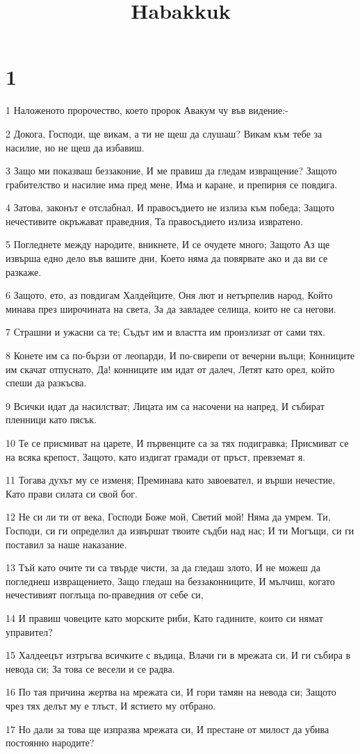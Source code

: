 

\title{Habakkuk}


\chapter{1}

\par 1 Наложеното пророчество, което пророк Авакум чу във видение:-
\par 2 Докога, Господи, ще викам, а ти не щеш да слушаш? Викам към тебе за насилие, но не щеш да избавиш.
\par 3 Защо ми показваш беззаконие, И ме правиш да гледам извращение? Защото грабителство и насилие има пред мене, Има и каране, и препирня се повдига.
\par 4 Затова, законът е отслабнал, И правосъдието не излиза към победа; Защото нечестивите окръжават праведния, Та правосъдието излиза извратено.
\par 5 Погледнете между народите, вникнете, И се очудете много; Защото Аз ще извърша едно дело във вашите дни, Което няма да повярвате ако и  да ви се разкаже.
\par 6 Защото, ето, аз повдигам Халдейците, Оня лют и нетърпелив народ, Който минава през широчината на света, За да завладее селища, които не са негови.
\par 7 Страшни и ужасни са те; Съдът им и властта им произлизат от сами тях.
\par 8 Конете им са по-бързи от леопарди, И по-свирепи от вечерни вълци; Конниците им скачат отпуснато, Да! конниците им идат от далеч, Летят като орел, който спеши да разкъсва.
\par 9 Всички идат да насилстват; Лицата им са насочени на напред, И събират пленници като пясък.
\par 10 Те се присмиват на царете, И първенците са за тях подигравка; Присмиват се на всяка крепост, Защото, като издигат грамади от пръст, превземат я.
\par 11 Тогава духът му се изменя; Преминава като завоевател, и върши нечестие, Като прави силата си свой бог.
\par 12 Не си ли ти от века, Господи Боже мой, Светий мой! Няма да умрем. Ти, Господи, си ги определил да извършат твоите съдби над нас; И ти Могъщи, си ги поставил за наше наказание.
\par 13 Тъй като очите ти са твърде чисти, за да гледаш злото, И не можеш да погледнеш извращението, Защо гледаш на беззаконниците, И мълчиш, когато нечестивият поглъща по-праведния от себе си,
\par 14 И правиш човеците като морските риби, Като гадините, които си нямат управител?
\par 15 Халдеецът изтръгва всичките с въдица, Влачи ги в мрежата си, И ги събира в невода си; За това се весели и се радва.
\par 16 По тая причина жертва на мрежата си, И гори тамян на невода си; Защото чрез тях делът му е тлъст, И ястието му отбрано.
\par 17 Но дали за това ще изпразва мрежата си, И престане от милост да убива постоянно народите?

